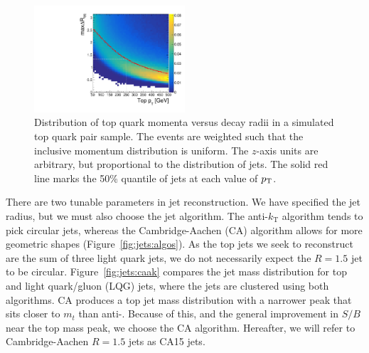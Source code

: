 \begin{figure}[]
    \begin{center}
        \includegraphics[width=0.5\textwidth]{figures/toptagging/gen/ptdr.pdf}
        \caption{Distribution of top quark momenta versus decay radii in a simulated top quark pair sample.
                 The events are weighted such that the inclusive momentum distribution is uniform. 
                 The $z$-axis units are arbitrary, but proportional to the distribution of jets. 
                 The solid red line marks the 50\% quantile of jets at each value of $p_\mathrm{T}$. }
        \label{fig:jets:dr}
    \end{center}
\end{figure}

There are two tunable parameters in jet reconstruction.
We have specified the jet radius, but we must also choose the jet algorithm.
The anti-$k_\mathrm{T}$ algorithm tends to pick circular jets, whereas the Cambridge-Aachen (CA) algorithm allows for more geometric shapes (Figure~\ref{fig:jets:algos}).
As the top jets we seek to reconstruct are the sum of three light quark jets, we do not necessarily expect the $R=1.5$ jet to be circular.
Figure~\ref{fig:jets:caak} compares the jet mass distribution for top and light quark/gluon (LQG) jets, where the jets are clustered using both algorithms.
CA produces a top jet mass distribution with a narrower peak that sits closer to $m_t$ than anti-\kt. 
Because of this, and the general improvement in $S/B$ near the top mass peak, we choose the CA algorithm.
Hereafter, we will refer to Cambridge-Aachen $R=1.5$ jets as CA15 jets. 

